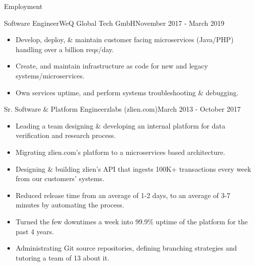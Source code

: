 \documentclass[]{mosabcv}
\begin{document}
\makeheader

\begin{cvsection}{Employment}
    
    \begin{cvsubsection}{Software Engineer}{WeQ Global Tech GmbH}{November 2017 - March 2019}
        \begin{itemize}
            \item Develop, deploy, \& maintain customer facing microservices (Java/PHP) handling over a billion reqs/day.
            \item Create, and maintain infrastructure as code for new and legacy systems/microservices.
            \item Own services uptime, and perform systems troubleshooting \& debugging.
        \end{itemize}
    \end{cvsubsection}
            
    \begin{cvsubsection}{Sr. Software \& Platform Engineer}{zlabs (zlien.com)}{March 2013 - October 2017}
        \begin{itemize}
            \item Leading a team designing \& developing an internal platform for data verification and research process.
            \item Migrating zlien.com's platform to a microservices based architecture.
            \item Designing \& building zlien's API that ingests 100K+ transactions every week from our customers' systems.
            \item Reduced release time from an average of 1-2 days, to an average of 3-7 minutes by automating the process.
            \item Turned the few downtimes a week into 99.9\% uptime of the platform for the past 4 years.
            \item Administrating Git source repositories, defining branching strategies and tutoring a team of 13 about it.
        \end{itemize}
    \end{cvsubsection}
    

\end{cvsection}
\end{document}
